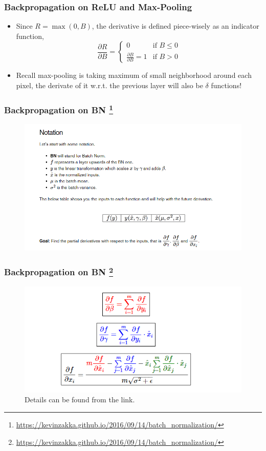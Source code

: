 \documentclass[10pt]{beamer}
\begin{document}
\begin{frame}
\frametitle{Backpropagation on ReLU and Max-Pooling}
\begin{itemize}
	\item Since $R = \max(0,B)$, the derivative is defined piece-wisely as an indicator function,
	\[
	\frac{\partial R}{\partial B} = \begin{cases} 0 &\mbox{if } B\leq 0 \\ 
	\frac{\partial B}{\partial B} = 1 & \mbox{if } B>0 \end{cases}  
	\]
	\item Recall max-pooling is taking maximum of small neighborhood around each pixel, the derivate of it w.r.t. the previous layer will also be $\delta$ functions!
\end{itemize}
\end{frame}


\begin{frame}
\frametitle{Backpropagation on BN \footnote{\url{https://kevinzakka.github.io/2016/09/14/batch_normalization/}}}
	\begin{figure}[H]
	\centerline{
		\includegraphics[width=1\textwidth]{back_bn.png}
	}
\end{figure}
\end{frame}



\begin{frame}
\frametitle{Backpropagation on BN \footnote{\url{https://kevinzakka.github.io/2016/09/14/batch_normalization/}}}
\begin{figure}[H]
	\centerline{
		\includegraphics[width=1\textwidth]{back_bn_2.png}
	}
\caption{Details can be found from the link.}
\end{figure}
\end{frame}
\end{document}
